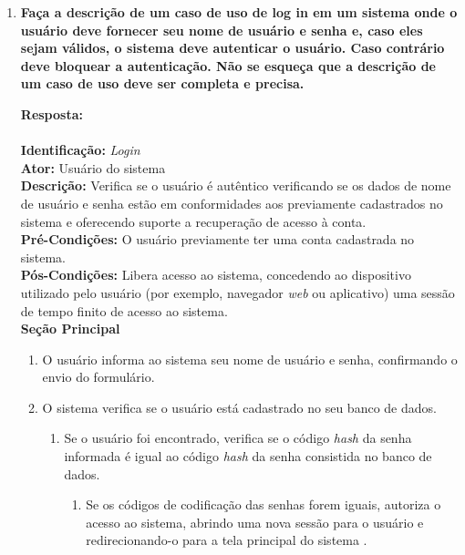 \documentclass[12pt, a4paper]{article}
\newcommand{\tit}[1]{\textit{#1}}
\newcommand{\tb}[1]{\textbf{#1}}
\newcommand{\question}[1]{\item \tb{#1}}
\newcommand{\answer}[1]{\par \tb{Resposta:} #1}
\begin{document}
\begin{enumerate}[label=\textbf{\arabic*.}]
{{{                }
            }
        }
        \newpage
        
        
        \question{Faça a descrição de um caso de uso de log in em um sistema onde o usuário deve fornecer seu nome de usuário e senha e, caso eles sejam válidos, o sistema deve autenticar o usuário. Caso contrário deve bloquear a autenticação. Não se esqueça que a descrição de um caso de uso deve ser completa e precisa.}
        \answer{ \\ \\
            \tb{Identificação:} \tit{Login} \\
            \tb{Ator:} Usuário do sistema \\
            \tb{Descrição:} Verifica se o usuário é autêntico verificando se os dados de nome de usuário e senha estão em conformidades aos previamente cadastrados no sistema e oferecendo suporte a recuperação de acesso à conta. \\ 
            \tb{Pré-Condições:} O usuário previamente ter uma conta cadastrada no sistema. \\
            \tb{Pós-Condições:} Libera acesso ao sistema, concedendo ao dispositivo utilizado pelo usuário (por exemplo, navegador \tit{web} ou aplicativo) uma sessão de tempo finito de acesso ao sistema. \\
            
            \tb{Seção Principal}
             \begin{enumerate}[label={\arabic*.}]
                 \item O usuário informa ao sistema seu nome de usuário e senha, confirmando o envio do formulário.
                 \item O sistema verifica se o usuário está cadastrado no seu banco de dados.
                     \begin{enumerate}[label={\alph*.}]
                         \item Se o usuário foi encontrado, verifica se o código \tit{hash} da senha informada é igual ao código \tit{hash} da senha consistida no banco de dados.
                            \begin{enumerate}[label={\roman*.}]
                                 \item Se os códigos de codificação das senhas forem iguais, autoriza o acesso ao sistema, abrindo uma nova sessão para o usuário e redirecionando-o para a tela principal do sistema .
                                 

\end{enumerate}
\end{enumerate}
\end{enumerate}}
\end{enumerate}
\end{document}
